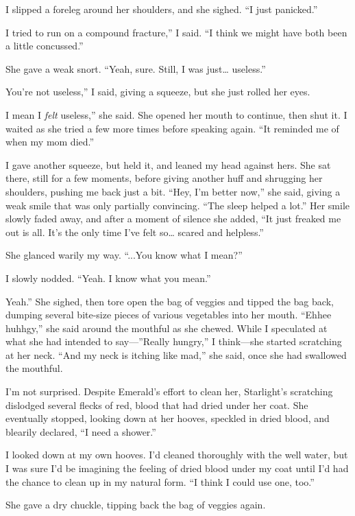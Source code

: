 I slipped a foreleg around her shoulders, and she sighed. “I just panicked.”

\leavevmode{}I tried to run on a compound fracture,” I said. “I think we might have both been a little concussed.”

She gave a weak snort. “Yeah, sure. Still, I was just… useless.”

\leavevmode{}You’re not useless,” I said, giving a squeeze, but she just rolled her eyes.

\leavevmode{}I mean I \textit{felt} useless,” she said. She opened her mouth to continue, then shut it. I waited as she tried a few more times before speaking again. “It reminded me of when my mom died.”

I gave another squeeze, but held it, and leaned my head against hers. She sat there, still for a few moments, before giving another huff and shrugging her shoulders, pushing me back just a bit. “Hey, I’m better now,” she said, giving a weak smile that was only partially convincing. “The sleep helped a lot.” Her smile slowly faded away, and after a moment of silence she added, “It just freaked me out is all. It’s the only time I’ve felt so… scared and helpless.”

She glanced warily my way. “...You know what I mean?”

I slowly nodded. “Yeah. I know what you mean.”

\leavevmode{}Yeah.” She sighed, then tore open the bag of veggies and tipped the bag back, dumping several bite-size pieces of various vegetables into her mouth. “Ehhee huhhgy,” she said around the mouthful as she chewed. While I speculated at what she had intended to say—”Really hungry,” I think—she started scratching at her neck. “And my neck is itching like mad,” she said, once she had swallowed the mouthful.

I’m not surprised. Despite Emerald’s effort to clean her, Starlight’s scratching dislodged several flecks of red, blood that had dried under her coat. She eventually stopped, looking down at her hooves, speckled in dried blood, and blearily declared, “I need a shower.”

I looked down at my own hooves. I’d cleaned thoroughly with the well water, but I was sure I’d be imagining the feeling of dried blood under my coat until I’d had the chance to clean up in my natural form. “I think I could use one, too.”

She gave a dry chuckle, tipping back the bag of veggies again.

